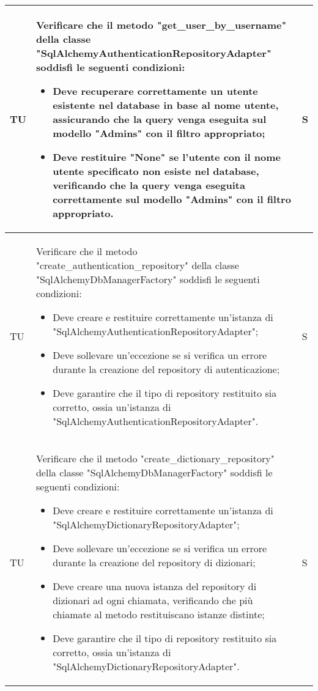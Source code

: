 \begin{adjustwidth}{-0.5cm}{-0.5cm}
\begin{longtable}{|P{1.5cm}|>{\raggedright}P{9.5cm}|>{\arraybackslash}P{1.5cm}|}
		\hline TU & Verificare che il metodo "get\_user\_by\_username" della classe "SqlAlchemyAuthenticationRepositoryAdapter" soddisfi le seguenti condizioni:
		\begin{itemize}
			\item Deve recuperare correttamente un utente esistente nel database in base al nome utente, assicurando che la query venga eseguita sul modello "Admins" con il filtro appropriato;
			\item Deve restituire "None" se l'utente con il nome utente specificato non esiste nel database, verificando che la query venga eseguita correttamente sul modello "Admins" con il filtro appropriato.
		\end{itemize} & S \\

		\hline TU & Verificare che il metodo "create\_authentication\_repository" della classe "SqlAlchemyDbManagerFactory" soddisfi le seguenti condizioni:
		\begin{itemize}
			\item Deve creare e restituire correttamente un'istanza di "SqlAlchemyAuthenticationRepositoryAdapter";
			\item Deve sollevare un'eccezione se si verifica un errore durante la creazione del repository di autenticazione;
			\item Deve garantire che il tipo di repository restituito sia corretto, ossia un'istanza di "SqlAlchemyAuthenticationRepositoryAdapter".
		\end{itemize} & S \\

		\hline TU & Verificare che il metodo "create\_dictionary\_repository" della classe "SqlAlchemyDbManagerFactory" soddisfi le seguenti condizioni:
		\begin{itemize}
			\item Deve creare e restituire correttamente un'istanza di "SqlAlchemyDictionaryRepositoryAdapter";
			\item Deve sollevare un'eccezione se si verifica un errore durante la creazione del repository di dizionari;
			\item Deve creare una nuova istanza del repository di dizionari ad ogni chiamata, verificando che più chiamate al metodo restituiscano istanze distinte;
			\item Deve garantire che il tipo di repository restituito sia corretto, ossia un'istanza di "SqlAlchemyDictionaryRepositoryAdapter".
		\end{itemize} & S \\


\end{longtable}
\end{adjustwidth}
